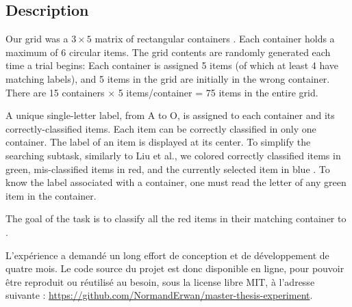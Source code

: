 \subsection{Description}


Our grid was a $3 \times 5$ matrix of rectangular containers . Each container holds a maximum of 6 circular items. The grid contents are randomly generated each time a trial begins: Each container is assigned 5 items (of which at least 4 have matching labels), and 5 items in the grid are initially in the wrong container. There are 15 containers $\times$ 5 items/container = 75 items in the entire grid.

A unique single-letter label, from A to O, is assigned to each container and its correctly-classified items. Each item can be correctly classified in only one container. The label of an item is displayed at its center. To simplify the searching subtask, similarly to Liu et al., we colored correctly classified items in green, mis-classified items in red, and the currently selected item in blue . To know the label associated with a container, one must read the letter of any green item in the container.

The goal of the task is to classify all the red items in their matching container to  \citep{Liu2014}.

L'expérience a demandé un long effort de conception et de développement de quatre mois. Le code source du projet est donc disponible en ligne, pour pouvoir être reproduit ou réutilisé au besoin, sous la license libre MIT, à l'adresse suivante : \url{https://github.com/NormandErwan/master-thesis-experiment}.


